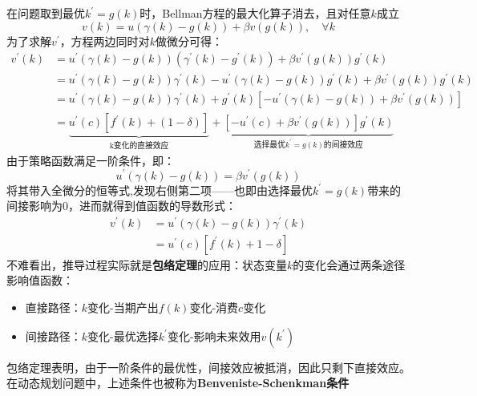 在问题取到最优$k^{\prime}=g\left(k\right)$时，Bellman方程的最大化算子消去，且对任意$k$成立
$$
v\left(k\right)=u\left(\gamma\left(k\right)-g\left(k\right)\right)+\beta v\left(g\left(k\right)\right),\quad \forall k
$$
为了求解$v^{\prime}$，方程两边同时对$k$做微分可得：
\begin{equation}
    \begin{aligned}
    v^{\prime}\left(k\right) 
    &= u^{\prime}\left(\gamma\left(k\right)-g\left(k\right)\right)\left(\gamma^{\prime}\left(k\right)-g^{\prime}\left(k\right)\right)
        + \beta v^{\prime}\left(g\left(k\right)\right)g^{\prime}\left(k\right) \\
    &= u^{\prime}\left(\gamma\left(k\right)-g\left(k\right)\right)\gamma^{\prime}\left(k\right) 
        -u^{\prime}\left(\gamma\left(k\right)-g\left(k\right)\right)g^{\prime}\left(k\right) 
        + \beta v^{\prime}\left(g\left(k\right)\right)g^{\prime}\left(k\right) \\
    & = u^{\prime}\left(\gamma\left(k\right)-g\left(k\right)\right)\gamma^{\prime}\left(k\right)
        +g^{\prime}\left(k\right)\left[-u^{\prime}\left(\gamma\left(k\right)-g\left(k\right)\right)+\beta v^{\prime}\left(g\left(k\right)\right)\right] \\
    &= \underbrace{u^{\prime}\left(c\right)\left[f^{\prime}\left(k\right)+\left(1-\delta\right)\right]}_{\text{k变化的直接效应}}
            + \underbrace{\left[-u^{\prime}\left(c\right)+\beta v^{\prime}\left(g\left(k\right)\right)\right]g^{\prime}\left(k\right)}
                _{\text{选择最优$k^{\prime}=g\left(k\right)$的间接效应}}
    \end{aligned}
\end{equation}
由于策略函数满足一阶条件，即：
$$
u^{\prime}\left(\gamma\left(k\right)-g\left(k\right)\right)=\beta v^{\prime}\left(g\left(k\right)\right)
$$
将其带入全微分的恒等式,发现右侧第二项——也即由选择最优$k^{\prime}=g(k)$带来的间接影响为0，进而就得到值函数的导数形式：
\begin{align}
    v^{\prime}\left(k\right) &= u^{\prime}\left(\gamma\left(k\right)-g\left(k\right)\right)\gamma^{\prime}\left(k\right) \nonumber \\
        &= u^{\prime}\left(c\right)\left[f^{\prime}\left(k\right)+1-\delta\right] \label{bs}
\end{align}
不难看出，推导过程实际就是\textbf{包络定理}的应用：状态变量$k$的变化会通过两条途径影响值函数：
\begin{itemize}
    \item 直接路径：$k$变化-当期产出$f\left(k\right)$变化-消费$c$变化
    \item 间接路径：$k$变化-最优选择$k^{\prime}$变化-影响未来效用$v\left(k^{\prime}\right)$
\end{itemize}
包络定理表明，由于一阶条件的最优性，间接效应被抵消，因此只剩下直接效应。在动态规划问题中，上述条件也被称为\textbf{Benveniste-Schenkman条件}

